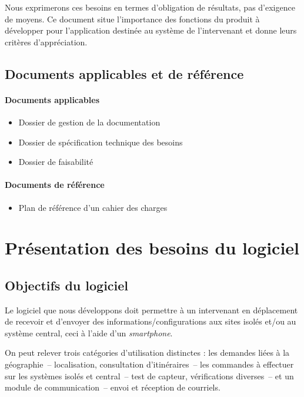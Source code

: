 \documentclass[a4paper, 11pt, final]{article}
\begin{document}
Nous exprimerons ces besoins en termes d'obligation de résultats, pas d'exigence de moyens. Ce document situe l'importance des fonctions du produit à développer pour l'application destinée au système de l'intervenant et donne leurs critères d'appréciation.

\subsection{Documents applicables et de référence}
\paragraph{Documents applicables}
\begin{itemize}
\item Dossier de gestion de la documentation
\item Dossier de spécification technique des besoins
\item Dossier de faisabilité
\end{itemize}

\paragraph{Documents de référence}
\begin{itemize}
\item Plan de référence d'un cahier des charges
\end{itemize}


\section{Présentation des besoins du logiciel}

\subsection{Objectifs du logiciel}
Le logiciel que nous développons doit permettre à un intervenant en déplacement de recevoir et d'envoyer des informations/configurations aux sites isolés et/ou au système central, ceci à l'aide d'un \emph{smartphone}.

On peut relever trois catégories d'utilisation distinctes : les demandes liées à la géographie~-- localisation, consultation d'itinéraires~-- les commandes à effectuer sur les systèmes isolés et central~-- test de capteur, vérifications diverses~--  et un module de communication~-- envoi et réception de courriels.
\end{document}
